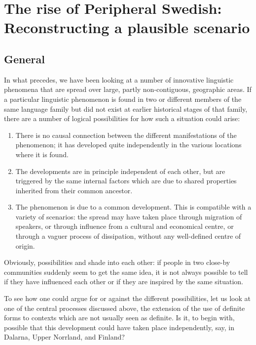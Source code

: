 
\chapter{The rise of Peripheral Swedish: Reconstructing a plausible scenario}
\section{General}
\label{sec:6.1}

In what precedes, we have been looking at a number of innovative linguistic phenomena that are spread over large, partly non-contiguous, geographic areas. If a particular linguistic phenomenon is found in two or different members of the same language family but did not exist at earlier historical stages of that family, there are a number of logical possibilities for how such a situation could arise:  

\begin{enumerate}
\item  
There is no causal connection between the different manifestations of the phenomenon; it has developed quite independently in the various locations where it is found. 
  
\item  
The developments are in principle independent of each other, but are triggered by the same internal factors which are due to shared properties inherited from their common ancestor. 
 
\item  
The phenomenon is due to a common development. This is compatible with a variety of scenarios: the spread may have taken place through migration of speakers, or through influence from a cultural and economical centre, or through a vaguer process of dissipation, without any well-defined centre of origin. 
\end{enumerate}



Obviously, possibilities  and  shade into each other: if people in two close-by communities suddenly seem to get the same idea, it is not always possible to tell if they have influenced each other or if they are inspired by the same situation. 

To see how one could argue for or against the different possibilities, let us look at one of the central processes discussed above, the extension of the use of definite forms to contexts which are not usually seen as definite. Is it, to begin with, possible that this development could have taken place independently, say, in Dalarna, Upper Norrland, and Finland? 

